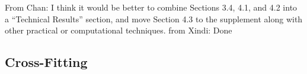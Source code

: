 \documentclass[12pt]{article}
\newcommand{\CP}[1]{{\color{purple}From Chan: #1}}
\newcommand{\XL}[1]{{\color{blue}from Xindi: #1}}
\begin{document}

    


\CP{I think it would be better to combine Sections 3.4, 4.1, and 4.2 into a “Technical Results” section, and move Section 4.3 to the supplement along with other practical or computational techniques.} \XL{Done}


\subsection{Cross-Fitting} \label{sec:cross-fitting}
\end{document}
